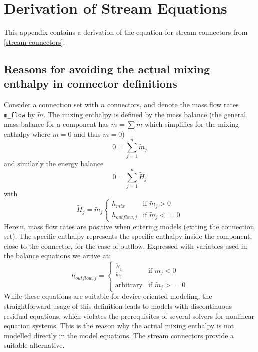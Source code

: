 \chapter{Derivation of Stream Equations}\label{derivation-of-stream-equations}

This appendix contains a derivation of the equation for stream
connectors from \cref{stream-connectors}.

\section{Reasons for avoiding the actual mixing enthalpy in connector definitions}\label{reasons-for-avoiding-the-actual-mixing-enthalpy-in-connector-definitions}

Consider a connection set with $n$ connectors, and denote the mass flow rates \lstinline!m_flow! by $\tilde{m}$.
The mixing enthalpy is defined by the mass balance (the general mass-balance for a component has
$\dot{m}=\sum\tilde{m}$ which simplifies for the mixing enthalpy where $m=0$ and thus $\dot{m}=0$)
\begin{equation*}
0=\sum_{j=1}^n\tilde{m}_j
\end{equation*}
and similarly the energy balance
\begin{equation*}
0=\sum_{j=1}^n\tilde{H}_j
\end{equation*}
with
\begin{equation*}
\tilde{H}_j=\tilde{m}_j
\begin{cases}
h_{mix}&\text{if $\tilde{m}_j>0$}\\
h_{outflow,j}&\text{if $\tilde{m}_j<=0$}
\end{cases}
\end{equation*}
Herein, mass flow rates are positive when entering models (exiting the
connection set). The specific enthalpy represents the specific enthalpy
inside the component, close to the connector, for the case of outflow.
Expressed with variables used in the balance equations we arrive at:
\begin{equation*}
h_{outflow,j}=
\begin{cases}
\frac{\tilde{H}_j}{\tilde{m}_j}&\text{if $\tilde{m}_j<0$}\\
\textrm{arbitrary}&\text{if $\tilde{m}_j>=0$}
\end{cases}
\end{equation*}
While these equations are suitable for device-oriented modeling, the
straightforward usage of this definition leads to models with
discontinuous residual equations, which violates the prerequisites of
several solvers for nonlinear equation systems. This is the reason why
the actual mixing enthalpy is not modelled directly in the model
equations. The stream connectors provide a suitable alternative.

